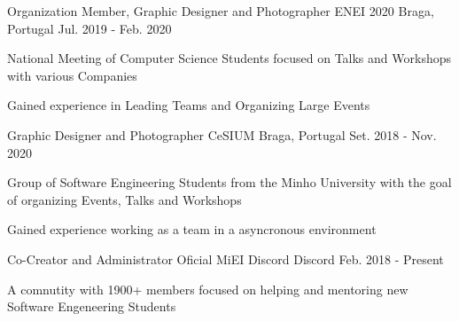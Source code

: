 
\begin{cventries}



\cventry
{Organization Member, Graphic Designer and Photographer} %
{ENEI 2020} %
{Braga, Portugal} %
{Jul. 2019 - Feb. 2020} %
{ %
\begin{cvitems}
\item{National Meeting of Computer Science Students focused on Talks and
  Workshops with various Companies}
\item {Gained experience in Leading Teams and Organizing Large Events}
\end{cvitems}
}


\cventry
{Graphic Designer and Photographer} %
{CeSIUM} %
{Braga, Portugal} %
{Set. 2018 - Nov. 2020} %
{ %
\begin{cvitems}
\item {Group of Software Engineering Students from the Minho University with the goal of
  organizing Events, Talks and Workshops}
\item {Gained experience working as a team in a asyncronous environment}
\end{cvitems}
}


\cventry
{Co-Creator and Administrator} %
{Oficial MiEI Discord} %
{Discord} %
{Feb. 2018 - Present} %
{ %
\begin{cvitems}
\item {A comnutity with 1900+ members focused on helping and mentoring new
  Software Engeneering Students}
\end{cvitems}
}


\end{cventries}
